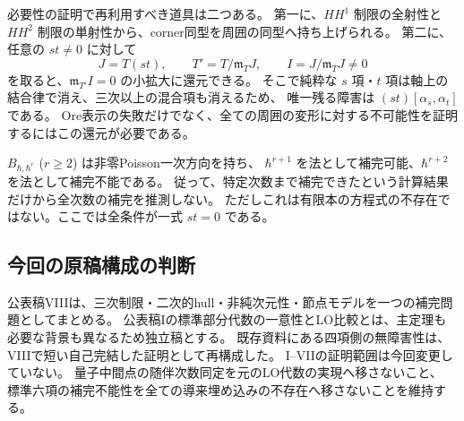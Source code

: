 必要性の証明で再利用すべき道具は二つある。
第一に、$HH^1$ 制限の全射性と $HH^2$ 制限の単射性から、corner同型を周囲の同型へ持ち上げられる。
第二に、任意の $st\neq0$ に対して
\[
 J=T(st),\qquad T'=T/\mathfrak m_TJ,
 \qquad I=J/\mathfrak m_TJ\neq0
\]
を取ると、$\mathfrak m_{T'}I=0$ の小拡大に還元できる。
そこで純粋な $s$ 項・$t$ 項は軸上の結合律で消え、三次以上の混合項も消えるため、
唯一残る障害は $(st)[\alpha_s,\alpha_t]$ である。
Ore表示の失敗だけでなく、全ての周囲の変形に対する不可能性を証明するにはこの還元が必要である。

$B_{\hbar,\hbar^r}$ ($r\ge2$) は非零Poisson一次方向を持ち、
$\hbar^{r+1}$ を法として補完可能、$\hbar^{r+2}$ を法として補完不能である。
従って、特定次数まで補完できたという計算結果だけから全次数の補完を推測しない。
ただしこれは有限本の方程式の不存在ではない。ここでは全条件が一式 $st=0$ である。

\subsection{今回の原稿構成の判断}
公表稿VIIIは、三次制限・二次的hull・非純次元性・節点モデルを一つの補完問題としてまとめる。
公表稿Iの標準部分代数の一意性とLO比較とは、主定理も必要な背景も異なるため独立稿とする。
既存資料にある四項側の無障害性は、VIIIで短い自己完結した証明として再構成した。
I--VIIの証明範囲は今回変更していない。
量子中間点の随伴次数同定を元のLO代数の実現へ移さないこと、
標準六項の補完不能性を全ての導来埋め込みの不存在へ移さないことを維持する。
